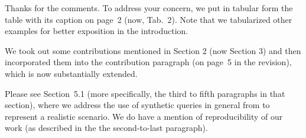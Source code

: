 \documentclass[10pt,letterpaper]{article}
\newenvironment{myindentpar}[1]%
{\begin{list}{}
         {\vspace{10pt}
					\setlength{\leftmargin}{#1}}
          \item[]
}
{\end{list}}
\newcommand{\rev}[1]{\begin{myindentpar}{.25in} {\em {\color{blue}{#1}}}\end{myindentpar}}
\begin{document}
\rev{
The table in Page3 does not have any caption to introduces besides, its location is badly organized.
}

Thanks for the comments. To address your concern, we put in tabular form the table with its caption on page~2 (now, {\color{blue}Tab.~2}). 
Note that we tabularized other examples for better exposition in the introduction.

\rev{
The main contribution of the paper is so limited and needs to be extended in Section 1. 
} 

We took out some contributions mentioned in Section 2 (now Section 3) and then incorporated them into the contribution paragraph (on page~5 
in the revision), which is now substantially extended. 

\rev{ 
In the experiment environmental setting, the deployment in realistic datasets are missing and must be indicated for the reproduction of the future readers.  
}

Please see Section~5.1 (more specifically, the third to fifth paragraphs in that section), where we address the use of synthetic queries in general from to represent a realistic scenario. We do have a mention of reproducibility of our work (as described in the the second-to-last paragraph).
\end{document}
